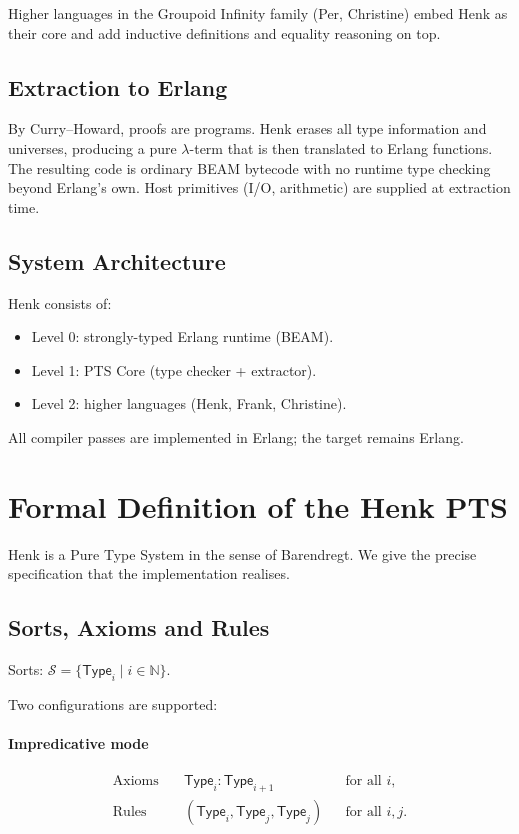 \documentclass{article}
\begin{document}
Higher languages in the Groupoid Infinity family (Per, Christine) embed Henk as their core and add inductive definitions and equality reasoning on top.

\subsection{Extraction to Erlang}
By Curry--Howard, proofs are programs. Henk erases all type information and universes, producing a pure $\lambda$-term that is then translated to Erlang functions.
The resulting code is ordinary BEAM bytecode with no runtime type checking beyond Erlang's own. Host primitives (I/O, arithmetic) are supplied at extraction time.

\subsection{System Architecture}

Henk consists of:

\begin{itemize}
\item Level 0: strongly-typed Erlang runtime (BEAM).
\item Level 1: PTS Core (type checker + extractor).
\item Level 2: higher languages (Henk, Frank, Christine).
\end{itemize}

All compiler passes are implemented in Erlang; the target remains Erlang.

\section{Formal Definition of the Henk PTS}

Henk is a Pure Type System in the sense of Barendregt. We give the precise specification that the implementation realises.

\subsection{Sorts, Axioms and Rules}

Sorts: $\mathcal{S} = \{\mathsf{Type}_i \mid i \in \mathbb{N}\}$.

Two configurations are supported:

\paragraph{Impredicative mode}
\begin{align*}
\text{Axioms} &\quad \mathsf{Type}_i : \mathsf{Type}_{i+1} &&\text{for all } i, \\
\text{Rules}  &\quad (\mathsf{Type}_i, \mathsf{Type}_j, \mathsf{Type}_j) &&\text{for all } i,j.
\end{align*}
\end{document}
